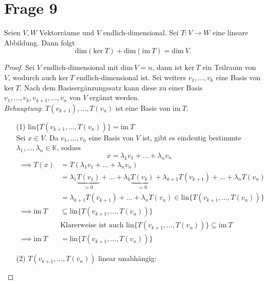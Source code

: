 \section{Frage 9}
\begin{theorem}
    Seien $V,W$ Vektorräume und $V$ endlich-dimensional. Sei $T:V\to W$
    eine lineare Abbildung. Dann folgt
    \[
        \mathrm{dim} (\mathrm{ker}\ T) + \mathrm{dim}(\mathrm{im}\ T) = \mathrm{dim}\ V
    .\]
\end{theorem}
\begin{proof}
    Sei $V$ endlich-dimensional mit $\mathrm{dim}\ V=n$, dann ist $\mathrm{ker}\ T$ ein 
    Teilraum von $V$, wodurch auch $\mathrm{ker}\ T$ endlich-dimensional ist. Sei
    weiters $v_1,\dots,v_k$ eine Basis von $\mathrm{ker}\ T$.
    Nach dem Basisergänzungssatz kann diese zu einer Basis $v_1,\dots,v_k,v_{k+1},\dots,v_n$
    von $V$ ergänzt werden.\\
    \textit{Behauptung}: $T(v_{k+1}),\dots,T(v_n)$ ist eine Basis von $\mathrm{im}\ T$.\\
    \begin{enumerate}
        \item[(1)] $\mathrm{lin}\{T(v_{k+1},\dots,T(v_{n}))\} = \mathrm{im}\ T$\\
        Sei $x\in V$. Da $v_1,\dots,v_n$ eine Basis von $V$ ist, gibt es 
        eindeutig bestimmte $\lambda_1,\dots,\lambda_n\in \mathbb{K}$, sodass
        \[
            x = \lambda_1v_1 + \dots + \lambda_n v_n    
        \]
        \begin{align*}
            \implies T(x) &= T(\lambda_1v_1 + \dots + \lambda_n v_n)\\
            &= \lambda_1 \underbrace{T(v_1)}_{=0} + \dots 
            + \lambda_k \underbrace{T(v_k)}_{=0} +
            \lambda_{k+1} T(v_{k+1}) + \dots +
            \lambda_n T(v_n)\\
            &=\lambda_{k+1} T(v_{k+1}) + \dots + \lambda_n T(v_n) 
            \in \mathrm{lin}\{T(v_{k+1},\dots,T(v_n))\}\\
            \implies \mathrm{im}\ T &\subseteq \mathrm{lin}\{
                T(v_{k+1},\dots,T(v_n))
            \}\\
            &\text{Klarerweise ist auch } \mathrm{lin}\{T(v_{k+1},\dots,T(v_n))\}\subseteq \mathrm{im}\ T\\
            \implies \mathrm{im}\ T &= \mathrm{lin}\{T(v_{k+1},\dots,T(v_n))\}
        \end{align*}
        \item[(2)] $T(v_{k+1},\dots,T(v_n))$ linear unabhängig:\\

\end{enumerate}
\end{proof}
